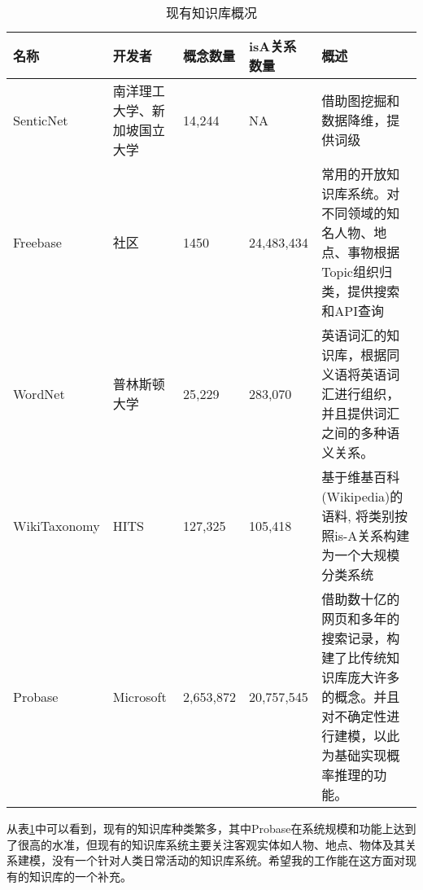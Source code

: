 \begin{table}[!h]
\begin{tabular}[0.7\textwidth]{|l|p{2cm}|l|l|p{4cm}|}

\hline
名称 		& 开发者 & 概念数量 & isA关系数量 & 概述 \\
\hline
SenticNet	& 南洋理工大学、新加坡国立大学 & 14,244 & NA & 借助图挖掘和数据降维，提供词级 \\
\hline
Freebase	& 社区	& 1450	& 24,483,434 & 常用的开放知识库系统。对不同领域的知名人物、地点、事物根据Topic组织归类，提供搜索和API查询 \\
\hline
WordNet\cite{miller1995wordnet} & 普林斯顿大学 & 25,229 & 283,070 & 英语词汇的知识库，根据同义语将英语词汇进行组织，并且提供词汇之间的多种语义关系。 \\
\hline
WikiTaxonomy\cite{ponzetto2007deriving}	& HITS & 127,325 & 105,418 & 基于维基百科(Wikipedia)的语料, 将类别按照is-A关系构建为一个大规模分类系统 \\
\hline
Probase & Microsoft & 2,653,872 & 20,757,545 & 借助数十亿的网页和多年的搜索记录，构建了比传统知识库庞大许多的概念。并且对不确定性进行建模，以此为基础实现概率推理的功能。 \\
\hline
\end{tabular}
\caption{现有知识库概况}
\label{table:knowledge_base}
\end{table}

从表\ref{table:knowledge_base}中可以看到，现有的知识库种类繁多，其中Probase在系统规模和功能上达到了很高的水准，但现有的知识库系统主要关注客观实体如人物、地点、物体及其关系建模，没有一个针对人类日常活动的知识库系统。希望我的工作能在这方面对现有的知识库的一个补充。


